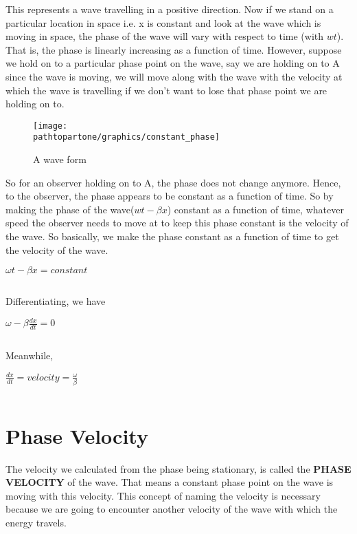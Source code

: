 This represents a wave travelling in a positive direction. Now if we stand on a particular location in space i.e. x is constant and look at the wave which is moving in space, the phase of the wave will vary with respect to time (with $wt$). That is, the phase is linearly increasing as a function of time. However, suppose we hold on to a particular phase point on the wave, say we are holding on to A since the wave is moving, we will move along with the wave with the velocity at which the wave is travelling if we don't want to lose that phase point we are holding on to.
\begin{figure}[h]
\centering
\texttt{[image: \\pathtopartone/graphics/constant\_phase]}
\caption{A wave form}
\end{figure}

So for an observer holding on to A, the phase does not change anymore. Hence, to the observer, the phase appears to be constant as a function of time. So by making the phase of the wave($wt - \beta x$) constant as a function of time, whatever speed the observer needs to move at to keep this phase constant is the velocity of the wave. So basically, we make the phase constant as a function of time to get the velocity of the wave.
\begin{center}
$\omega t-\beta x = constant$
\end{center}
\begin{equation}\end{equation}

Differentiating, we have
\begin{center}
$\omega-\beta\frac{dx}{dt}=0$
\end{center}
\begin{equation}\end{equation}

Meanwhile, 
\begin{center}
$\frac{dx}{dt}=velocity=\frac{\omega}{\beta}$
\end{center}
\begin{equation}\end{equation}

\section{\textbf{Phase Velocity}}
The velocity we calculated from the phase being stationary, is called the \textbf{PHASE VELOCITY} of the wave. That means a constant phase point on the wave is moving with this velocity. This concept of naming the velocity is necessary because we are going to encounter another velocity of the wave with which the energy travels.

